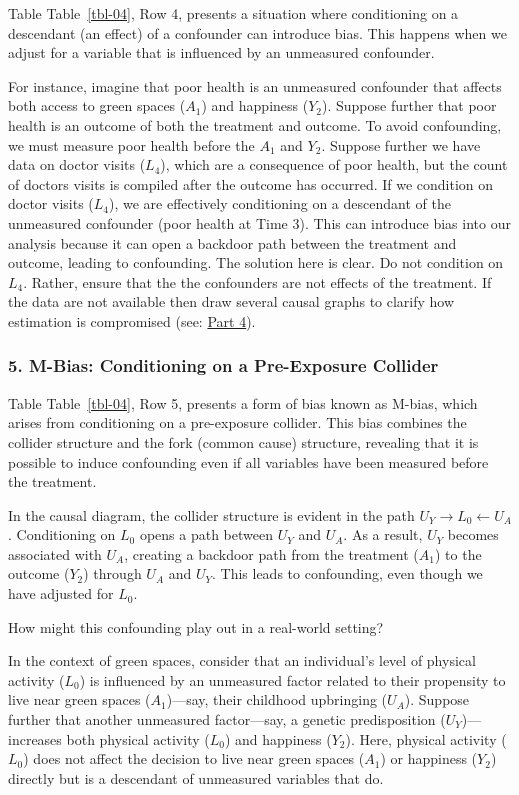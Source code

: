 \documentclass[
  singlecolumn]{article}
\begin{document}
Table Table~\ref{tbl-04}, Row 4, presents a situation where conditioning
on a descendant (an effect) of a confounder can introduce bias. This
happens when we adjust for a variable that is influenced by an
unmeasured confounder.

For instance, imagine that poor health is an unmeasured confounder that
affects both access to green spaces (\(A_1\)) and happiness (\(Y_2\)).
Suppose further that poor health is an outcome of both the treatment and
outcome. To avoid confounding, we must measure poor health before the
\(A_1\) and \(Y_2\). Suppose further we have data on doctor visits
(\(L_4\)), which are a consequence of poor health, but the count of
doctors visits is compiled after the outcome has occurred. If we
condition on doctor visits (\(L_4\)), we are effectively conditioning on
a descendant of the unmeasured confounder (poor health at Time 3). This
can introduce bias into our analysis because it can open a backdoor path
between the treatment and outcome, leading to confounding. The solution
here is clear. Do not condition on \(L_4\). Rather, ensure that the the
confounders are not effects of the treatment. If the data are not
available then draw several causal graphs to clarify how estimation is
compromised (see: \hyperref[section-part4]{Part 4}).

\subsubsection{5. M-Bias: Conditioning on a Pre-Exposure
Collider}\label{section-mbias}

Table Table~\ref{tbl-04}, Row 5, presents a form of bias known as
M-bias, which arises from conditioning on a pre-exposure collider. This
bias combines the collider structure and the fork (common cause)
structure, revealing that it is possible to induce confounding even if
all variables have been measured before the treatment.

In the causal diagram, the collider structure is evident in the path
\(U_Y \to L_0 \leftarrow U_A\). Conditioning on \(L_0\) opens a path
between \(U_Y\) and \(U_A\). As a result, \(U_Y\) becomes associated
with \(U_A\), creating a backdoor path from the treatment (\(A_1\)) to
the outcome (\(Y_2\)) through \(U_A\) and \(U_Y\). This leads to
confounding, even though we have adjusted for \(L_0\).

How might this confounding play out in a real-world setting?

In the context of green spaces, consider that an individual's level of
physical activity (\(L_0\)) is influenced by an unmeasured factor
related to their propensity to live near green spaces (\(A_1\))---say,
their childhood upbringing (\(U_A\)). Suppose further that another
unmeasured factor---say, a genetic predisposition (\(U_Y\))---increases
both physical activity (\(L_0\)) and happiness (\(Y_2\)). Here, physical
activity (\(L_0\)) does not affect the decision to live near green
spaces (\(A_1\)) or happiness (\(Y_2\)) directly but is a descendant of
unmeasured variables that do.
\end{document}

